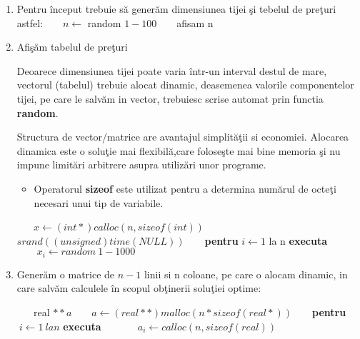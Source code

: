 \documentclass{article}
\begin{document}
\begin{enumerate}

\item Pentru \^inceput trebuie s\u{a} gener\u{a}m dimensiunea tijei \c{s}i tebelul de pre\c{t}uri astfel: \newline
 \indent $ \> \> \> \> \> \> $ $ n\leftarrow $ random $   1- 100 $ \newline
\indent $ \> \> \> \> \> \> $ afisam n

 \item Afi\c{s}\u{a}m tabelul de pre\c{t}uri \newline
\par \qquad Deoarece dimensiunea tijei poate varia \^{i}ntr-un interval destul de mare, vectorul (tabelul) trebuie alocat dinamic, deasemenea valorile componentelor tijei, pe care le salv\u{a}m in vector, trebuiesc scrise automat prin functia {\bf random}.
\par \qquad Structura de vector/matrice are avantajul simplit\u{a}\c{t}ii si economiei. Alocarea dinamica este o solu\c{t}ie mai flexibil\u{a},care folose\c{s}te mai bine memoria \c{s}i nu impune limit\u{a}ri arbitrere asupra utiliz\u{a}ri unor programe.
\newline
\begin{itemize}
\item Operatorul {\bf sizeof} este utilizat pentru a determina num\u{a}rul de octe\c{t}i necesari unui tip de variabile.
\end{itemize}
\indent $ \> \> \> \> \> \> $ $ x \leftarrow (int *) calloc (n,sizeof(int)) $  \newline
\indent $ \> \> \> \> \> \> $ $ srand((unsigned) time(NULL)) $ 
\newline
\indent $ \> \> \> \> \> \> $ {\bf pentru} $ i\leftarrow 1 $ la n  {\bf executa} \newline
\indent $ \> \> \> \> \> \> $ $\>   \>  \> \> \> \> \> \> \> x_i \leftarrow random \> 1-1000 $
\newline 

\item Gener\u{a}m o matrice de $ n-1 $ linii si n coloane, pe care o alocam dinamic, in care salv\u{a}m calculele \^{i}n scopul ob\c{t}inerii solu\c{t}iei optime:

\indent $ \> \> \> \> \> \> $ real $**a $ \newline
\indent $ \> \> \> \> \> \> $ $ a \leftarrow  (real **) malloc(n * sizeof(real *)) $ \newline
\indent $ \> \> \> \> \> \> $ {\bf pentru} $ \> i  \leftarrow 1 \> la n $ {\bf executa} \newline
\indent $ \> \> \> \> \> \> $ $ \> \> \> \> \> \> $ $ a_i \leftarrow calloc(n, sizeof(real)) $
\newline


\end{enumerate}
\end{document}
